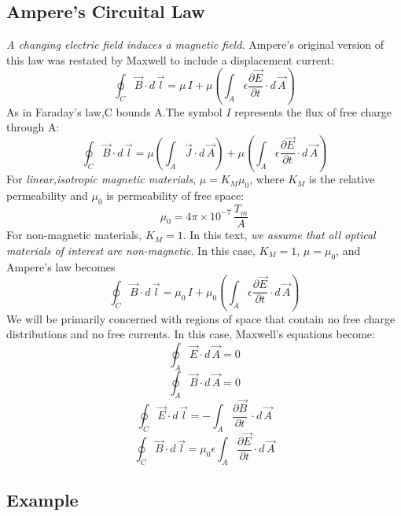 \documentclass[12pt]{article}
\numberwithin{equation}{section}
\begin{document}
\subsection{Ampere's Circuital Law}
\emph{A changing electric field induces a magnetic field.} Ampere's original version of this law was restated by Maxwell to include a displacement current:
\[
    \oint_C \vec{B} \cdot d\,\vec{l}=\mu\,I+\mu(\int_A \epsilon \frac{\partial{\vec{E}}}{\partial{t}}\cdot d\,\vec{A}) 
\]
As in Faraday's law,C bounds A.The symbol $I$ represents the flux of free charge through A:
\[
    \oint_C \vec{B} \cdot d\,\vec{l}=\mu (\int_A \vec{J} \cdot d\,\vec{A})+\mu (\int_A \epsilon \frac{\partial{\vec{E}}}{\partial{t}}\cdot d\,\vec{A})
\]
For \emph{linear,isotropic magnetic materials}, $\mu=K_M\mu_0$, where $K_M$ is the relative permeability and $\mu_0$ is permeability of free space:
\begin{equation}
    \mu_0=4\pi\times10^{-7}\,\frac{T_m}{A}
\end{equation}
For non-magnetic materials, $K_M=1$. In this text, \emph{we assume that all optical materials of interest are non-magnetic}. In this case, $K_M=1$, $\mu=\mu_0$, and Ampere's law becomes
\begin{equation}
    \oint_C \vec{B} \cdot d\,\vec{l}=\mu_0\,I+\mu_0(\int_A \epsilon \frac{\partial{\vec{E}}}{\partial{t}}\cdot d\,\vec{A})\label{18}
\end{equation} 
\indent We will be primarily concerned with regions of space that contain no free charge distributions and no free currents. In this case, Maxwell's equations become:
\begin{equation}
    \oint_A \vec{E}\cdot d\,\vec{A}=0
\end{equation}
\begin{equation}
    \oint_A \vec{B}\cdot d\,\vec{A}=0
\end{equation}
\begin{equation}
    \oint_C \vec{E}\cdot d\,\vec{l}=-\int_A \frac{\partial{\vec{B}}}{\partial{t}}\,\cdot d\,\vec{A}
\end{equation}
\begin{equation}
    \oint_C \vec{B} \cdot d\,\vec{l}=\mu_0\epsilon\int_A \frac{\partial{\vec{E}}}{\partial{t}}\cdot d\,\vec{A}
\end{equation}



\subsection{Example}
\newpage
\end{document}
